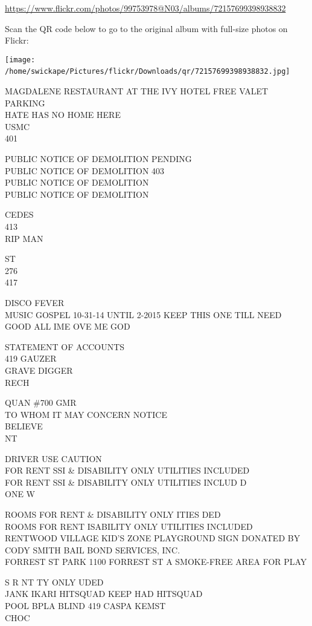 \documentclass[10pt,letterpaper]{article}
\begin{document}
\url{https://www.flickr.com/photos/99753978@N03/albums/72157699398938832}

Scan the QR code below to go to the original album with full-size photos on Flickr:

\texttt{[image: /home/swickape/Pictures/flickr/Downloads/qr/72157699398938832.jpg]}
\

MAGDALENE RESTAURANT AT THE IVY HOTEL FREE VALET PARKING\\
HATE HAS NO HOME HERE\\
USMC\\
401

PUBLIC NOTICE OF DEMOLITION PENDING\\
PUBLIC NOTICE OF DEMOLITION 403\\
PUBLIC NOTICE OF DEMOLITION\\
PUBLIC NOTICE OF DEMOLITION

CEDES\\
413\\
RIP MAN

ST\\
276\\
417

DISCO FEVER\\
MUSIC GOSPEL 10{-}31{-}14 UNTIL 2{-}2015 KEEP THIS ONE TILL NEED GOOD ALL IME OVE ME GOD

STATEMENT OF ACCOUNTS\\
419 GAUZER\\
GRAVE DIGGER\\
RECH

QUAN \#700 GMR\\
TO WHOM IT MAY CONCERN NOTICE\\
BELIEVE\\
NT

DRIVER USE CAUTION\\
FOR RENT SSI \& DISABILITY ONLY UTILITIES INCLUDED\\
FOR RENT SSI \& DISABILITY ONLY UTILITIES INCLUD D\\
ONE W

ROOMS FOR RENT \& DISABILITY ONLY ITIES DED\\
ROOMS FOR RENT ISABILITY ONLY UTILITIES INCLUDED\\
RENTWOOD VILLAGE KID'S ZONE PLAYGROUND SIGN DONATED BY CODY SMITH BAIL BOND SERVICES, INC.\\
FORREST ST PARK 1100 FORREST ST A SMOKE{-}FREE AREA FOR PLAY

S R NT TY ONLY UDED\\
JANK IKARI HITSQUAD KEEP HAD HITSQUAD\\
POOL BPLA BLIND 419 CASPA KEMST\\
CHOC
\end{document}
